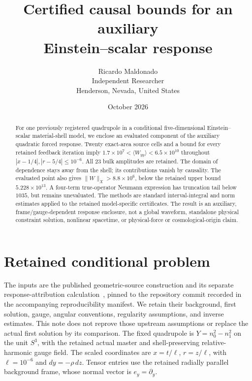 \documentclass[11pt]{article}
\title{Certified causal bounds for an auxiliary\\Einstein--scalar response}
\author{Ricardo Maldonado\\Independent Researcher\\Henderson, Nevada, United States}
\date{October 2026}
\begin{document}
\maketitle
\begin{abstract}
For one previously registered quadrupole in a conditional five-dimensional
Einstein--scalar material-shell model, we enclose an evaluated component of the
auxiliary quadratic forced response. Twenty exact-area source cells and a
bound for every retained feedback iteration imply
$1.7\times10^7<\langle W_{yy}\rangle<6.5\times10^{10}$ throughout
$|x-1/4|,|r-5/4|\le10^{-6}$. All 23 bulk amplitudes are retained. The domain
of dependence stays away from the shell; its contributions vanish by causality.
The evaluated point also gives $\|W\|_X>8.8\times10^6$, below the retained
upper bound $5.228\times10^{13}$. A four-term true-operator Neumann expression
has truncation tail below $1035$, but remains unevaluated. The methods are
standard interval-integral and norm estimates applied to the retained
model-specific certificates. The result is an auxiliary, frame/gauge-dependent
response enclosure, not a global waveform, standalone physical constraint
solution, nonlinear spacetime, or physical-force or cosmological-origin claim.
\end{abstract}

\section{Retained conditional problem}
The inputs are the published geometric-source construction and its separate
response-attribution calculation~\cite{sources,attribution}, pinned to the
repository commit recorded in the accompanying reproducibility manifest.
We retain their background, first solution, gauge, angular conventions,
regularity assumptions, and inverse estimates. This note does not reprove those
upstream assumptions or replace the actual first solution by its comparison.
The fixed quadrupole is $Y=n_0^2-n_1^2$ on the unit $S^3$, with the retained
actual master and shell-preserving relative-harmonic gauge field. The scaled
coordinates are $x=t/\ell$, $r=z/\ell$, with $\ell=10^{-6}$ and
$dy=-\rho\,dz$. Tensor entries use the retained radially parallel background
frame, whose normal vector is $e_y=\partial_y$.
\end{document}
